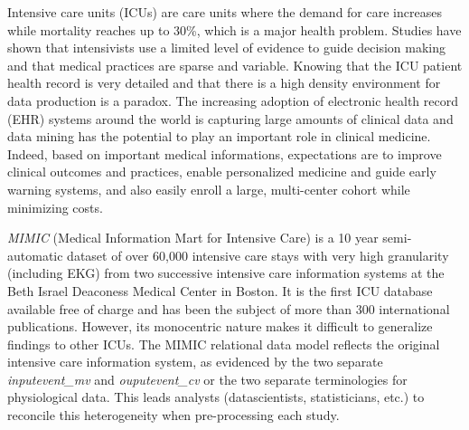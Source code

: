 %
%
Intensive care units (ICUs) are care units where the demand for care 
increases\cite{angus2000} while mortality reaches up to 30\%, 
which is a major health problem\cite{icu-mortality}. 
Studies have shown that intensivists use a limited level of evidence 
to guide decision making\cite{icu-evidence} 
and that medical practices are sparse and variable.
Knowing that the ICU patient health record is very detailed and that there is 
a high density environment for data production is a paradox. 
The increasing adoption of electronic health record (EHR) systems 
around the world is capturing large amounts of clinical data\cite{bigdata-promise} 
and data mining has the potential to play an important role 
in clinical medicine\cite{bigdata-mining}. 
Indeed, based on important medical informations, expectations are 
to improve clinical outcomes and practices, 
enable personalized medicine and guide early warning systems, 
and also easily enroll a large, multi-center cohort while minimizing costs.

\emph{MIMIC} (Medical Information Mart for Intensive Care) 
is a 10 year semi-automatic dataset of over 60,000 intensive care stays 
with very high granularity (including EKG) 
from two successive intensive care information systems
 at the Beth Israel Deaconess Medical Center in Boston. 
It is the first ICU database available free of charge and has been the subject 
of more than 300 international publications. 
However, its monocentric nature makes it difficult to generalize findings to other ICUs. 
The MIMIC relational data model reflects the original intensive care information system, 
as evidenced by the two separate \textit{inputevent\_mv} and \textit{ouputevent\_cv} \cite{mimic-nature}
or the two separate terminologies for physiological data. 
This leads analysts (datascientists, statisticians, etc.) 
to reconcile this heterogeneity when pre-processing each study.

